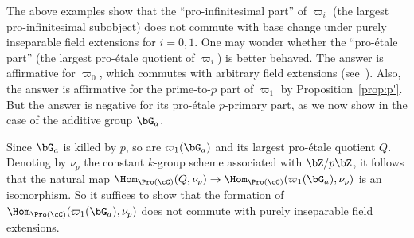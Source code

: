 \begin{rema}\label{3.19.3}
The above examples show that the ``pro-infinitesimal part'' of $\varpi_i$ (the largest pro-infinitesimal subobject) does not commute with base change under purely inseparable field extensions for $i = 0, 1$. One may wonder whether the ``pro-\'etale part'' (the largest pro-\'etale quotient of $\varpi_i$) is better behaved. The answer is affirmative for $\varpi_0$, which commutes with arbitrary field extensions (see~\cite[II.5.1]{DG}). Also, the answer is affirmative for the prime-to-$p$ part of $\varpi_1$ by Proposition~\ref{prop:p'}. But the answer is negative for its pro-\'etale $p$-primary part, as we now show in the case of the additive group $\bG_a$.

Since $\bG_a$ is killed by $p$, so are $\varpi_1(\bG_a)$ and its largest pro-\'etale quotient $Q$. Denoting by $\nu_p$ the constant $k$-group scheme associated with $\bZ/p \bZ$, it follows that the natural map $\Hom_{\Pro(\cC)}(Q,\nu_p) \to
\Hom_{\Pro(\cC)}(\varpi_1(\bG_a), \nu_p)$ is an isomorphism. So it suffices to show that the formation of $\Hom_{\Pro(\cC)}(\varpi_1(\bG_a), \nu_p)$ does not commute with purely inseparable field extensions.


\end{rema}
